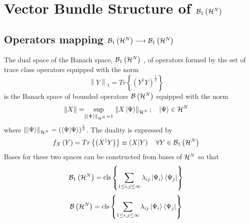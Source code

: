                       

\section{Vector Bundle Structure of ${\cal B}_{1}\left( {\cal H}^{N}\right) $%
}

\subsection{Operators mapping ${\cal B}_{1}\left( {\cal H}^{N}\right)
\longrightarrow {\cal B}_{1}\left( {\cal H}^{N}\right) $}

The dual space of the Banach space, ${\cal B}_{1}\left( {\cal H}^{N}\right) $%
, of operators formed by the set of trace class operators equipped with the
norm%
\begin{equation}
\left\| Y\right\| _{1}=Tr\left\{ \left( Y^{\dagger }Y\right) ^{\frac{1}{2}%
}\right\}
\end{equation}%
is the Banach space of bounded operators ${\cal B}\left( {\cal H}^{N}\right) 
$ equipped with the norm%
\begin{equation}
\left\| X\right\| =%
\mathrel{\mathop{\sup }\limits_{\left\| \left| \Psi \right\rangle \right\| _{{\cal H}^{N}}=1}}%
\left\| X\left| \Psi \right\rangle \right\| _{{\cal H}^{N}};\quad \left|
\Psi \right\rangle \in {\cal H}^{N}
\end{equation}%
where $\left\| \left| \Psi \right\rangle \right\| _{{\cal H}^{N}}=\left(
\left\langle \Psi |\Psi \right\rangle \right) ^{\frac{1}{2}}$. The duality
is expressed by%
\begin{equation}
f_{X}\left( Y\right) =Tr\left\{ \left( X^{\dagger }Y\right) \right\} \equiv
\left( X|Y\right) \quad \forall Y\in {\cal B}_{1}\left( {\cal H}^{N}\right)
\end{equation}%
Bases for these two spaces can be constructed from bases of ${\cal H}^{N}$
so that 
\begin{equation}
{\cal B}_{1}\left( {\cal H}^{N}\right) ={\rm cls}\left\{ \sum\limits_{1\leq
i,j\leq \infty }\lambda _{ij}\left| \Psi _{i}\right\rangle \left\langle \Psi
_{j}\right| \right\}  \label{TCBasis}
\end{equation}%
\begin{equation}
{\cal B}\left( {\cal H}^{N}\right) ={\rm cls}\left\{ \sum_{1\leq i,j\leq
\infty }\lambda _{ij}\left| \Psi _{i}\right\rangle \left\langle \Psi
_{j}\right| \right\}  \label{BoundBasis}
\end{equation}%
